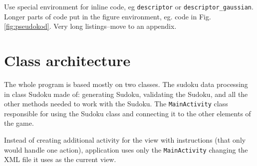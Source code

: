 \documentclass[a4paper,twoside,12pt]{book}
\begin{document}
Use special environment for inline code, eg \lstinline|descriptor| or \lstinline|descriptor_gaussian|. 
Longer parts of code put in the figure environment, eg. code in Fig. \ref{fig:pseudokod}. Very long listings–move to an appendix.

\clearpage
\fi

\section {Class architecture}

\par
The whole program is based mostly on two classes. The sudoku data processing in class Sudoku made of: generating Sudoku, validating the Sudoku, and all the other methods needed to work with the Sudoku. The \lstinline|MainActivity| class responsible for using the Sudoku class and connecting it to the other elements of the game.
\par Instead of creating additional activity for the view with instructions (that only would handle one action), application uses only the \lstinline|MainActivity| changing the XML file it uses as the current view.
\end{document}
